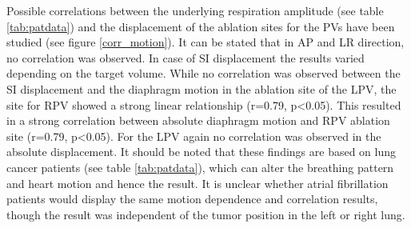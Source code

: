 \documentclass[type=dr, dr=rernat, accentcolor=tud7b,colorbacktitle, bigchapter, openright, twoside, 12pt ]{tudthesis}
\begin{document}
\vspace*{0.5cm}

Possible correlations between the underlying respiration amplitude (see table \ref{tab:patdata}) and the displacement of the ablation sites 
for the PVs have been studied (see figure \ref{corr_motion}). It can be stated that in AP and LR direction, no correlation was 
observed. In case of SI displacement the results varied depending on the target volume. While no correlation was 
observed between the SI displacement and the diaphragm motion in the ablation site of the LPV, the site for RPV showed a strong linear 
relationship (r=0.79, p<0.05). This resulted in a strong correlation between absolute diaphragm motion and RPV ablation site (r=0.79, p<0.05). 
For the LPV again no correlation was observed in the absolute displacement. \newline
\newline
It should be noted that these findings are based on lung cancer 
patients (see table \ref{tab:patdata}), which can alter the breathing pattern and heart motion and hence the result. It is unclear whether 
atrial fibrillation patients would display the same motion dependence and correlation results, though the result was independent of 
the tumor position in the left or right lung. 



\newpage
\end{document}

